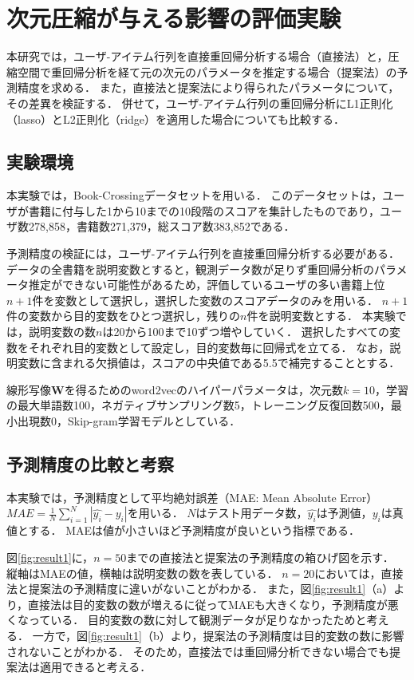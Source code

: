 \section{次元圧縮が与える影響の評価実験}
本研究では，ユーザ-アイテム行列を直接重回帰分析する場合（直接法）と，圧縮空間で重回帰分析を経て元の次元のパラメータを推定する場合（提案法）の予測精度を求める．
また，直接法と提案法により得られたパラメータについて，その差異を検証する．
併せて，ユーザ-アイテム行列の重回帰分析にL1正則化（lasso）とL2正則化（ridge）を適用した場合についても比較する．

\subsection{実験環境}
本実験では，Book-Crossingデータセットを用いる．
このデータセットは，ユーザが書籍に付与した1から10までの10段階のスコアを集計したものであり，ユーザ数278,858，書籍数271,379，総スコア数383,852である．

予測精度の検証には，ユーザ-アイテム行列を直接重回帰分析する必要がある．
データの全書籍を説明変数とすると，観測データ数が足りず重回帰分析のパラメータ推定ができない可能性があるため，評価しているユーザの多い書籍上位$n+1$件を変数として選択し，選択した変数のスコアデータのみを用いる．
$n+1$件の変数から目的変数をひとつ選択し，残りの$n$件を説明変数とする．
本実験では，説明変数の数$n$は20から100まで10ずつ増やしていく．
選択したすべての変数をそれぞれ目的変数として設定し，目的変数毎に回帰式を立てる．
なお，説明変数に含まれる欠損値は，スコアの中央値である5.5で補完することとする．

線形写像$\boldsymbol{W}$を得るためのword2vecのハイパーパラメータは，次元数$k=10$，学習の最大単語数100，ネガティブサンプリング数5，トレーニング反復回数500，最小出現数0，Skip-gram学習モデルとしている．





\subsection{予測精度の比較と考察}
本実験では，予測精度として平均絶対誤差（MAE: Mean Absolute Error）$MAE = \frac{1}{N} \sum_{i=1}^N |\hat{y_i} - y_i|$を用いる．
$N$はテスト用データ数，$\hat{y_i}$は予測値，$y_i$は真値とする．
MAEは値が小さいほど予測精度が良いという指標である．

図\ref{fig:result1}に，$n=50$までの直接法と提案法の予測精度の箱ひげ図を示す．
縦軸はMAEの値，横軸は説明変数の数を表している．
$n=20$においては，直接法と提案法の予測精度に違いがないことがわかる．
また，図\ref{fig:result1}（a）より，直接法は目的変数の数が増えるに従ってMAEも大きくなり，予測精度が悪くなっている．
目的変数の数に対して観測データが足りなかったためと考える．
一方で，図\ref{fig:result1}（b）より，提案法の予測精度は目的変数の数に影響されないことがわかる．
そのため，直接法では重回帰分析できない場合でも提案法は適用できると考える．

